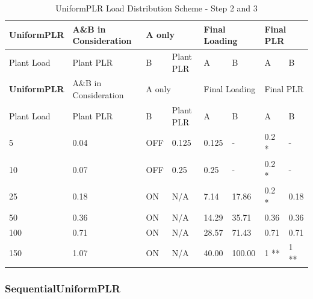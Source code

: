 \begin{longtable}[c]{|l|l|l|l|l|l|l|l|}
    \caption{UniformPLR Load Distribution Scheme - Step 2 and 3}
    \label{tab:uniformplr-load-overview-step23}\\
\hline
\textbf{UniformPLR} & A\&B in Consideration & \multicolumn{2}{l|}{A only} & \multicolumn{2}{l|}{Final Loading} & \multicolumn{2}{l|}{Final PLR} \\ \hline
Plant Load & Plant PLR             & B         & Plant PLR       & A               & B                & A              & B             \\ \hline
\endfirsthead
\hline
\textbf{UniformPLR} & A\&B in Consideration & \multicolumn{2}{l|}{A only} & \multicolumn{2}{l|}{Final Loading} & \multicolumn{2}{l|}{Final PLR} \\ \hline
Plant Load & Plant PLR             & B         & Plant PLR       & A               & B                & A              & B             \\ \hline
\endhead

5          & 0.04                  & OFF       & 0.125           & 0.125           & -                & 0.2 *          & -             \\ \hline
10         & 0.07                  & OFF       & 0.25            & 0.25            & -                & 0.2 *          & -             \\ \hline
25         & 0.18                  & ON        & N/A             & 7.14            & 17.86            & 0.2 *          & 0.18          \\ \hline
50         & 0.36                  & ON        & N/A             & 14.29           & 35.71            & 0.36           & 0.36          \\ \hline
100        & 0.71                  & ON        & N/A             & 28.57           & 71.43            & 0.71           & 0.71          \\ \hline
150        & 1.07                  & ON        & N/A             & 40.00           & 100.00           & 1 **           & 1 **          \\ \hline

\end{longtable}




\subsubsection{SequentialUniformPLR}%
\label{ssub:sequentialuniformplr}

